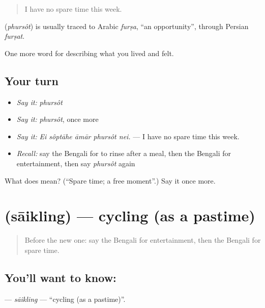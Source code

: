 \begin{quote}
I have no spare time this week.
\end{quote}

\begin{cousinweb}
\textbf{} (\emph{phursôt}) is usually traced to Arabic \emph{furṣa}, \textquotedblleft{}an opportunity\textquotedblright{}, through Persian \emph{furṣat}.
\end{cousinweb}

\begin{grammarlens}[title={What you've built}]
One more word for describing what you lived and felt.
\end{grammarlens}

\subsection*{Your turn}
\begin{itemize}
\raggedright
  \item \emph{Say it:} \emph{phursôt}
  \item \emph{Say it:} \emph{phursôt}, once more
  \item \emph{Say it:} \emph{Ei sôptāhe āmār phursôt nei.} — I have no spare time this week.
  \item \emph{Recall:} say the Bengali for to rinse after a meal, then the Bengali for entertainment, then say \emph{phursôt} again
\end{itemize}

\begin{tcolorbox}[breakable,colback=teal!4,colframe=teal!35!black,title={Before you move on}]
What does  mean? (\textquotedblleft{}Spare time; a free moment\textquotedblright{}.) Say it once more.
\end{tcolorbox}
\section[\texorpdfstring{\bn{সাইক্লিং} (sāikling)}{সাইক্লিং (sāikling)}]{ (sāikling) — cycling (as a pastime)}

\label{lesson:BN-C516-saikling}



\begin{quote}
Before the new one: say the Bengali for entertainment, then the Bengali for spare time.
\end{quote}

\subsection*{You'll want to know: }
\textbf{} — \emph{sāikling} — \textquotedblleft{}cycling (as a pastime)\textquotedblright{}.

